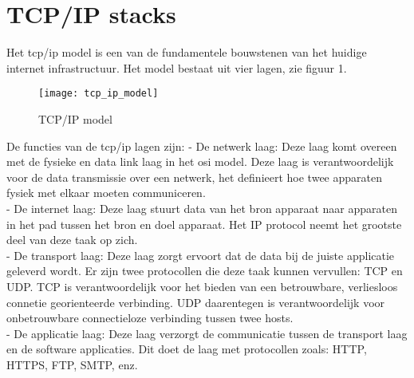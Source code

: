 \documentclass[../DCM2_Verslag.tex]{subfiles}
\begin{document}
\section{TCP/IP stacks}
Het tcp/ip model is een van de fundamentele bouwstenen van het huidige internet infrastructuur. Het model bestaat uit vier lagen, zie figuur 1.\\
\begin{figure}[h]
\centering
\texttt{[image: tcp\_ip\_model]}
\caption{TCP/IP model}
\end{figure}
De functies van de tcp/ip lagen zijn:
- De netwerk laag: Deze laag komt overeen met de fysieke en data link laag in het osi model. Deze laag is verantwoordelijk voor de data transmissie over een netwerk, het definieert hoe twee apparaten fysiek met elkaar moeten communiceren.
\\
- De internet laag: Deze laag stuurt data van het bron apparaat naar apparaten in het pad tussen het bron en doel apparaat. Het IP protocol neemt het grootste deel van deze taak op zich.
\\
- De transport laag: Deze laag zorgt ervoort dat de data bij de juiste applicatie geleverd wordt. Er zijn twee protocollen die deze taak kunnen vervullen: TCP en UDP. TCP is verantwoordelijk voor het bieden van een betrouwbare, verliesloos connetie georienteerde verbinding. UDP daarentegen is verantwoordelijk voor onbetrouwbare connectieloze verbinding tussen twee hosts.
\\
- De applicatie laag: Deze laag verzorgt de communicatie tussen de transport laag en de software applicaties. Dit doet de laag met protocollen zoals: HTTP, HTTPS, FTP, SMTP, enz.
\\
\end{document}
